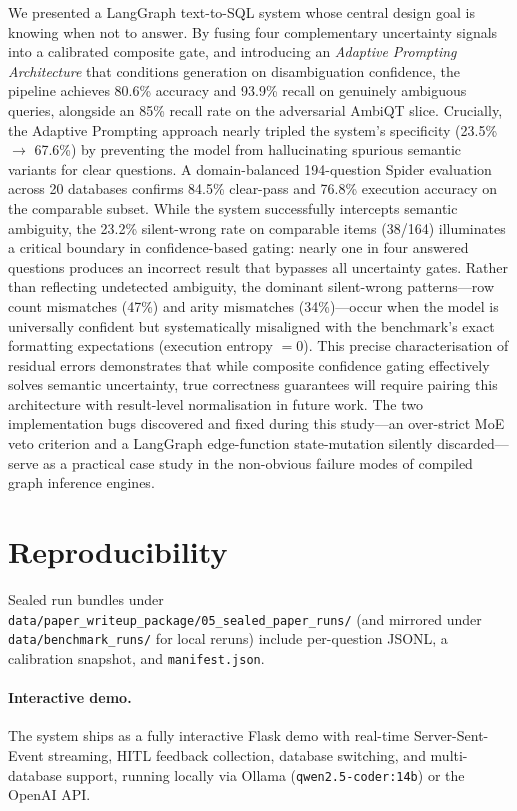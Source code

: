 \documentclass{article}
\begin{document}
We presented a LangGraph text-to-SQL system whose central design goal is
knowing when not to answer. By fusing four complementary uncertainty signals
into a calibrated composite gate, and introducing an \emph{Adaptive Prompting
Architecture} that conditions generation on disambiguation confidence, the
pipeline achieves 80.6\% accuracy and 93.9\% recall on genuinely ambiguous
queries, alongside an 85\% recall rate on the adversarial AmbiQT slice.
Crucially, the Adaptive Prompting approach nearly tripled the system's
specificity (23.5\% $\to$ 67.6\%) by preventing the model from hallucinating
spurious semantic variants for clear questions.
A domain-balanced 194-question Spider evaluation across 20 databases confirms
84.5\% clear-pass and 76.8\% execution accuracy on the comparable subset.
While the system successfully intercepts semantic ambiguity, the 23.2\% silent-wrong
rate on comparable items (38/164) illuminates a critical boundary in
confidence-based gating: nearly one in four answered questions produces an
incorrect result that bypasses all uncertainty gates. Rather than reflecting
undetected ambiguity, the dominant silent-wrong patterns---row count mismatches
(47\%) and arity mismatches (34\%)---occur when the model is universally
confident but systematically misaligned with the benchmark's exact formatting
expectations (execution entropy $=0$). This precise characterisation of residual
errors demonstrates that while composite confidence gating effectively solves
semantic uncertainty, true correctness guarantees will require pairing this
architecture with result-level normalisation in future work.
The two implementation bugs discovered and fixed during this study---an
over-strict MoE veto criterion and a LangGraph edge-function state-mutation
silently discarded---serve as a practical case study in the non-obvious
failure modes of compiled graph inference engines.

\section*{Reproducibility}
\label{sec:reproducibility}

Sealed run bundles under \texttt{data/paper\_writeup\_package/05\_sealed\_paper\_runs/}
(and mirrored under \texttt{data/benchmark\_runs/} for local reruns) include
per-question JSONL, a calibration snapshot, and \texttt{manifest.json}.

\paragraph{Interactive demo.}
The system ships as a fully interactive Flask demo with real-time
Server-Sent-Event streaming, HITL feedback collection, database switching,
and multi-database support, running locally via Ollama
(\texttt{qwen2.5-coder:14b}) or the OpenAI API.
\end{document}

